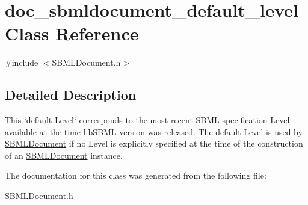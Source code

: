 \hypertarget{classdoc__sbmldocument__default__level}{}\section{doc\+\_\+sbmldocument\+\_\+default\+\_\+level Class Reference}
\label{classdoc__sbmldocument__default__level}


{\ttfamily \#include $<$S\+B\+M\+L\+Document.\+h$>$}



\subsection{Detailed Description}
\begin{DoxyParagraph}{}
This \char`\"{}default Level\char`\"{} corresponds to the most recent S\+B\+ML specification Level available at the time lib\+S\+B\+ML version  was released. The default Level is used by \hyperlink{class_s_b_m_l_document}{S\+B\+M\+L\+Document} if no Level is explicitly specified at the time of the construction of an \hyperlink{class_s_b_m_l_document}{S\+B\+M\+L\+Document} instance. 
\end{DoxyParagraph}


The documentation for this class was generated from the following file\+:\begin{DoxyCompactItemize}
\item 
\hyperlink{_s_b_m_l_document_8h}{S\+B\+M\+L\+Document.\+h}\end{DoxyCompactItemize}
